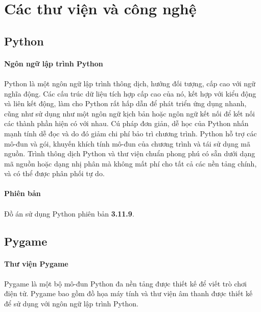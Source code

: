 \newpage
\section{Các thư viện và công nghệ}
\subsection{Python}
\paragraph{Ngôn ngữ lập trình Python} \cite{python}
\paragraph{}{Python là một ngôn ngữ lập trình thông dịch, hướng đối tượng, cấp cao với ngữ nghĩa động. Các cấu trúc dữ liệu tích hợp cấp cao của nó, kết hợp với kiểu động và liên kết động, làm cho Python rất hấp dẫn để phát triển ứng dụng nhanh, cũng như sử dụng như một ngôn ngữ kịch bản hoặc ngôn ngữ kết nối để kết nối các thành phần hiện có với nhau. Cú pháp đơn giản, dễ học của Python nhấn mạnh tính dễ đọc và do đó giảm chi phí bảo trì chương trình. Python hỗ trợ các mô-đun và gói, khuyến khích tính mô-đun của chương trình và tái sử dụng mã nguồn. Trình thông dịch Python và thư viện chuẩn phong phú có sẵn dưới dạng mã nguồn hoặc dạng nhị phân mà không mất phí cho tất cả các nền tảng chính, và có thể được phân phối tự do.}

\paragraph{Phiên bản}
\paragraph{}{Đồ án sử dụng Python phiên bản \textbf{3.11.9}.}

\subsection{Pygame}

\paragraph{Thư viện Pygame} \cite{pygame}
\paragraph{}{Pygame là một bộ mô-đun Python đa nền tảng được thiết kế để viết trò chơi điện tử. Pygame bao gồm đồ họa máy tính và thư viện âm thanh được thiết kế để sử dụng với ngôn ngữ lập trình Python.}

